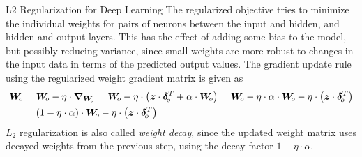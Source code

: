 \begin{frame}{L2 Regularization for Deep Learning}
The regularized objective tries to minimize the individual weights
for pairs of neurons between the input and hidden, and hidden and
output layers. This has the effect of adding some bias to the model, but possibly
reducing variance, since small weights are more robust to changes in the
input data in terms of the predicted output values.
%
The gradient update rule using the regularized weight gradient matrix is
given as
\begin{align*}
    \bW_{\!o} & = \bW_{\!o} - \eta \cdot \bgrad_{\bW_{\!o}}
    = \bW_{\!o} - \eta \cdot \lB(\bz \cdot \bdelta_{\!o}^T +
    \alpha \cdot \bW_{\!o}\rB)
     = \bW_{\!o} - \eta \cdot \alpha \cdot \bW_{\!o} - \eta \cdot \lB(\bz \cdot
     \bdelta_{\!o}^T \rB)\\
     & = (1-\eta\cdot\alpha) \cdot \bW_{\!o} - \eta \cdot \lB(\bz \cdot \bdelta_{\!o}^T \rB)
\end{align*}
$L_2$ regularization is also called {\em weight decay}, since 
the updated weight matrix uses decayed weights from the
previous step, using the decay factor $1-\eta \cdot \alpha$.
\end{frame}

